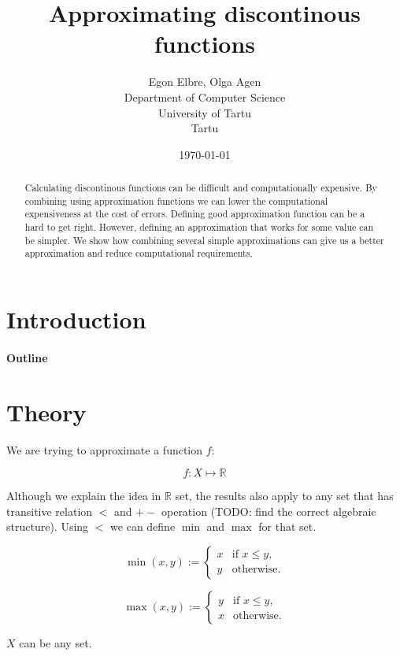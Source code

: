 \documentclass [12pt]{article} %
\title{Approximating discontinous functions}
\author{
    Egon Elbre, Olga Agen \\
        Department of Computer Science \\
    University of Tartu\\
    Tartu\\
}
\date{\today}
\begin{document}
\maketitle

\begin{abstract}
Calculating discontinous functions can be difficult and computationally
expensive. By combining using approximation functions we can lower 
the computational expensiveness at the cost of errors.
Defining good approximation function can be a hard to get right. 
However, defining an approximation that works for some value can 
be simpler. We show how combining several simple approximations 
can give us a better approximation and reduce computational requirements.
\end{abstract}

\section{Introduction}

\paragraph{Outline}

\section{Theory}

\newcommand{\Real}{\mathbb{R}}
\newcommand{\defas}{ := }
\newcommand{\err}[1]{\varepsilon_{#1}}

We are trying to approximate a function $f$:

$$f : X \mapsto \Real$$

Although we explain the idea in $\Real$ set, the results also apply to 
any set that has transitive relation $<$ and $+-$ operation (TODO: find the correct algebraic structure). 
Using $<$ we can define $\min$ and $\max$ for that set.

$$ \min(x,y) \defas \begin{cases}
    x & \text{if $x \leq y$}, \\
    y & \text{otherwise}.
\end{cases}
$$

$$
\max(x,y) \defas \begin{cases}
    y & \text{if $x \leq y$}, \\
    x & \text{otherwise}.
\end{cases}
$$

$X$ can be any set.
\end{document}
